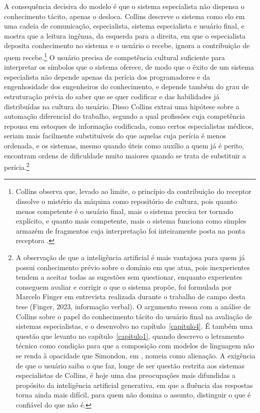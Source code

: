 A consequência decisiva do modelo é que o sistema especialista não dispensa o conhecimento tácito, apenas o desloca. Collins descreve o sistema como elo em uma cadeia de comunicação, especialista, sistema especialista e usuário final, e mostra que a leitura ingênua, da esquerda para a direita, em que o especialista deposita conhecimento no sistema e o usuário o recebe, ignora a contribuição de quem recebe.\footnote{Collins observa que, levado ao limite, o princípio da contribuição do receptor dissolve o mistério da máquina como repositório de cultura, pois quanto menos competente é o usuário final, mais o sistema precisa ter tornado explícito, e quanto mais competente, mais o sistema funciona como simples armazém de fragmentos cuja interpretação foi inteiramente posta na ponta receptora \parencite[pp.~326--327]{Collins2012Expert}.} O usuário precisa de competência cultural suficiente para interpretar os símbolos que o sistema oferece, de modo que o êxito de um sistema especialista não depende apenas da perícia dos programadores e da engenhosidade dos engenheiros do conhecimento, e depende também do grau de estruturação prévia do saber que se quer codificar e das habilidades já distribuídas na cultura do usuário. Disso Collins extrai uma hipótese sobre a automação diferencial do trabalho, segundo a qual profissões cuja competência repousa em estoques de informação codificada, como certos especialistas médicos, seriam mais facilmente substituíveis do que aquelas cuja perícia é menos ordenada, e os sistemas, mesmo quando úteis como auxílio a quem já é perito, encontram ordens de dificuldade muito maiores quando se trata de substituir a perícia.\footnote{A observação de que a inteligência artificial é mais vantajosa para quem já possui conhecimento prévio sobre o domínio em que atua, pois inexperientes tendem a aceitar todas as sugestões sem questionar, enquanto experientes conseguem avaliar e corrigir o que o sistema propõe, foi formulada por Marcelo Finger em entrevista realizada durante o trabalho de campo desta tese (Finger, 2023, informação verbal). O argumento ressoa com a análise de Collins sobre o papel do conhecimento tácito do usuário final na avaliação de sistemas especialistas, e o desenvolvo no capítulo~\ref{capitulo4}. É também uma questão que levanto no capítulo~\ref{capitulo1}, quando descrevo o letramento técnico como condição para que a composição com modelos de linguagem não se renda à opacidade que Simondon, em \textcite{Vicentin_2022_Esboco}, nomeia como alienação. A exigência de que o usuário saiba o que faz, longe de ser questão restrita aos sistemas especialistas de Collins, é hoje uma das preocupações mais difundidas a propósito da inteligência artificial generativa, em que a fluência das respostas torna ainda mais difícil, para quem não domina o assunto, distinguir o que é confiável do que não é.}


